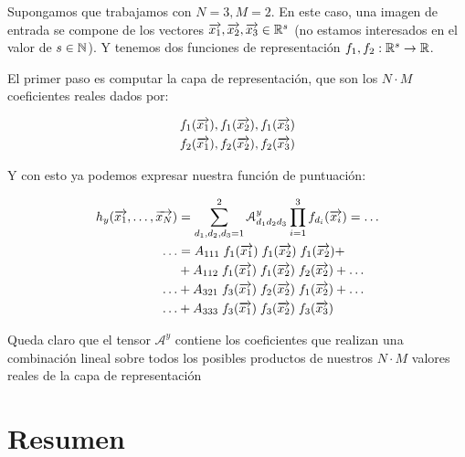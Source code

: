 \begin{ejemplo} \label{ejemplo:funcion_puntuacion}

Supongamos que trabajamos con $N = 3, M = 2$. En este caso, una imagen de entrada se compone de los vectores $\overrightarrow{x_1}, \overrightarrow{x_2}, \overrightarrow{x_3} \in \mathbb{R}^s$ (no estamos interesados en el valor de $s \in \mathbb{N}$). Y tenemos dos funciones de representación $f_1, f_2: \mathbb{R}^s \to \mathbb{R}$.

El primer paso es computar la capa de representación, que son los $N \cdot M$ coeficientes reales dados por:

\begin{equation}
\begin{split}
    f_1(\overrightarrow{x_1}), f_1(\overrightarrow{x_2}), f_1(\overrightarrow{x_3}) \\
    f_2(\overrightarrow{x_1}), f_2(\overrightarrow{x_2}), f_2(\overrightarrow{x_3})
\end{split}
\end{equation}

Y con esto ya podemos expresar nuestra función de puntuación:

\begin{equation}
\begin{split}
    h_y(\overrightarrow{x_1}, \ldots, \overrightarrow{x_N}) &= \sum_{d_1, d_2, d_3 = 1}^{2} \mathcal{A}^y_{d_1 d_2 d_3} \prod_{i = 1}^3 f_{d_i}(\overrightarrow{x_i}) = \ldots \\
    \ldots &= A_{111} \; f_1(\overrightarrow{x_1}) \; f_1(\overrightarrow{x_2}) \; f_1(\overrightarrow{x_2}) + \\
           &+ A_{112} \; f_1(\overrightarrow{x_1}) \; f_1(\overrightarrow{x_2}) \; f_2(\overrightarrow{x_2}) + \ldots \\
           \ldots &+ A_{321} \; f_3(\overrightarrow{x_1}) \; f_2(\overrightarrow{x_2}) \; f_1(\overrightarrow{x_2}) + \ldots \\
           \ldots &+ A_{333} \; f_3(\overrightarrow{x_1}) \; f_3(\overrightarrow{x_2}) \; f_3(\overrightarrow{x_3})
\end{split}
\end{equation}

Queda claro que el tensor $\mathcal{A}^y$ contiene los coeficientes que realizan una combinación lineal sobre todos los posibles productos de nuestros $N \cdot M$ valores reales de la capa de representación

\end{ejemplo}

\section{Resumen}

